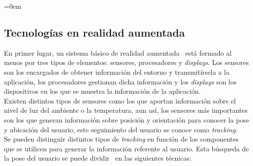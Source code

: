 \parindent=0em
\subsection{Tecnologías en realidad aumentada}
\noindent


En primer lugar, un sistema básico de realidad aumentada~\cite{arhardwarerequirements} está formado al menos por tres tipos de elementos: sensores, procesadores y \textit{displays}. Los sensores son los encargados de obtener información del entorno y transmitírsela a la aplicación, los procesadores gestionan dicha información y los \textit{displays} son los dispositivos en los que se muestra la información de la aplicación.\\

Existen distintos tipos de sensores como los que aportan información sobre el nivel de luz del ambiente o la temperatura, aun así, los sensores más importantes son los que generan información sobre posición y orientación para conocer la pose y ubicación del usuario, este seguimiento del usuario se conoce como \textit{tracking}.\\

Se pueden distinguir distintos tipos de \textit{tracking} en función de los componentes que se utilicen para generar la información referente al usuario. Esta búsqueda de la pose del usuario se puede dividir~\cite{tracking1} en las siguientes técnicas:  

